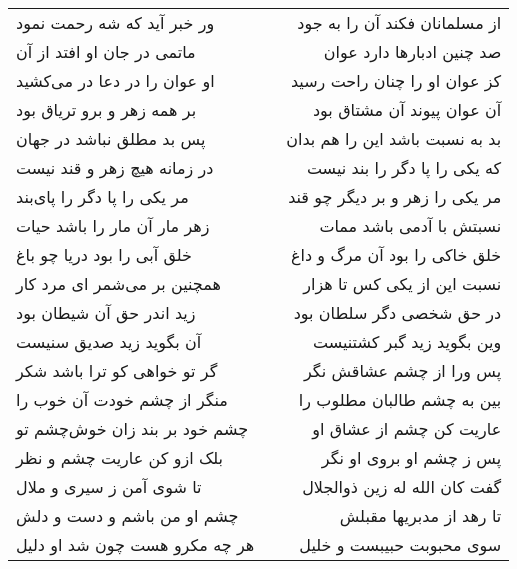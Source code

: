 \begin{center}
\begin{longtable}{l p{0.5cm} r}
\\
ور خبر آید که شه رحمت نمود
&&
از مسلمانان فکند آن را به جود
\\
ماتمی در جان او افتد از آن
&&
صد چنین ادبارها دارد عوان
\\
او عوان را در دعا در می‌کشید
&&
کز عوان او را چنان راحت رسید
\\
بر همه زهر و برو تریاق بود
&&
آن عوان پیوند آن مشتاق بود
\\
پس بد مطلق نباشد در جهان
&&
بد به نسبت باشد این را هم بدان
\\
در زمانه هیچ زهر و قند نیست
&&
که یکی را پا دگر را بند نیست
\\
مر یکی را پا دگر را پای‌بند
&&
مر یکی را زهر و بر دیگر چو قند
\\
زهر مار آن مار را باشد حیات
&&
نسبتش با آدمی باشد ممات
\\
خلق آبی را بود دریا چو باغ
&&
خلق خاکی را بود آن مرگ و داغ
\\
همچنین بر می‌شمر ای مرد کار
&&
نسبت این از یکی کس تا هزار
\\
زید اندر حق آن شیطان بود
&&
در حق شخصی دگر سلطان بود
\\
آن بگوید زید صدیق سنیست
&&
وین بگوید زید گبر کشتنیست
\\
گر تو خواهی کو ترا باشد شکر
&&
پس ورا از چشم عشاقش نگر
\\
منگر از چشم خودت آن خوب را
&&
بین به چشم طالبان مطلوب را
\\
چشم خود بر بند زان خوش‌چشم تو
&&
عاریت کن چشم از عشاق او
\\
بلک ازو کن عاریت چشم و نظر
&&
پس ز چشم او بروی او نگر
\\
تا شوی آمن ز سیری و ملال
&&
گفت کان الله له زین ذوالجلال
\\
چشم او من باشم و دست و دلش
&&
تا رهد از مدبریها مقبلش
\\
هر چه مکرو هست چون شد او دلیل
&&
سوی محبوبت حبیبست و خلیل
\\
\end{longtable}
\end{center}
